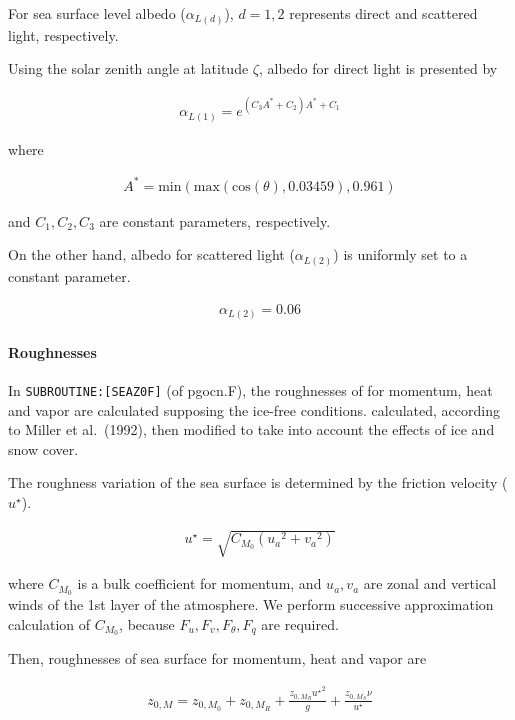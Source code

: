 For sea surface level albedo (\(\alpha_{L(d)}\)), \(d=1,2\) represents direct and scattered light, respectively.

Using the solar zenith angle at latitude \(\zeta\), albedo for direct light is presented by

\begin{eqnarray}
    \alpha_{L(1)} = e^{(C_3A^* + C_2) A^* +C_1}
\end{eqnarray}

where

\begin{eqnarray}
    A^* = \mathrm{min}(\mathrm{max}(\mathrm{cos}(\theta),0.03459),0.961)
\end{eqnarray}

and \(C_1,C_2,C_3\) are constant parameters, respectively.

On the other hand, albedo for scattered light (\(\alpha_{L(2)}\)) is uniformly set to a constant parameter.

\begin{eqnarray}
    \alpha_{L(2)} = 0.06
\end{eqnarray}

\hypertarget{roughnesses}{%
\paragraph{Roughnesses}\label{roughnesses}}

In \texttt{SUBROUTINE:{[}SEAZ0F{]}} (of pgocn.F), the roughnesses of for momentum, heat and vapor are calculated supposing the ice-free conditions. calculated, according to Miller et al.~(1992), then
modified to take into account the effects of ice and snow cover.

The roughness variation of the sea surface is determined by the friction velocity (\(u^\star\)).

\begin{eqnarray}
u^{\star} = \sqrt{C_{M_0} ({u_a}^2  +{v_a}^2)}
\end{eqnarray}

where \(C_{M_0}\) is a bulk coefficient for momentum, and \(u_a,v_a\) are zonal and vertical winds of the 1st layer of the atmosphere. We perform successive approximation calculation of \({C_{M_0}}\),
because \(F_u,F_v,F_\theta,F_q\) are required.

Then, roughnesses of sea surface for momentum, heat and vapor are

\begin{eqnarray}
    z_{0,M} = z_{0,M_0} + z_{0,M_R} + \frac{z_{0,M_R} {u^\star }^2 }{g} + \frac{z_{0,M_S}\nu }{u^\star}
\end{eqnarray}

